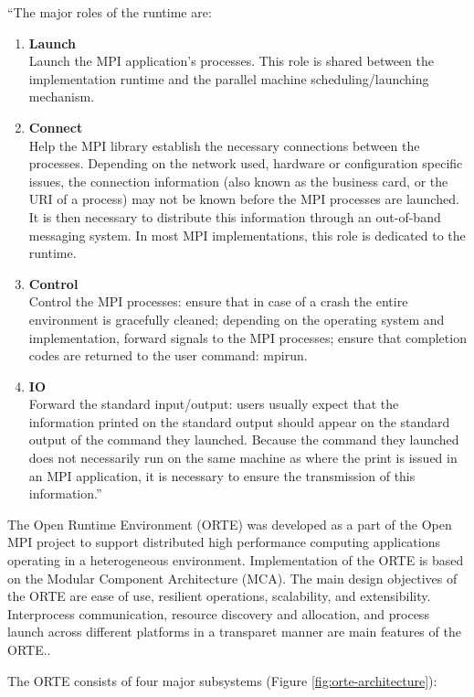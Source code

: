 ``The major roles of the runtime are:
\begin{enumerate}
\item \textbf{Launch}\\
  Launch the MPI application’s processes. This role is shared between the implementation runtime and the parallel machine scheduling/launching mechanism.
\item \textbf{Connect}\\
  Help the MPI library establish the necessary connections between the processes. Depending on the network used, hardware or configuration specific issues, the connection information (also known as the business card, or the URI of
a process) may not be known before the MPI processes are launched. It is then necessary to distribute this information through an out-of-band messaging system. In most MPI implementations, this role is dedicated to the runtime.
\item \textbf{Control}\\
  Control the MPI processes: ensure that in case of a crash the entire environment is gracefully cleaned; depending on the operating system and implementation, forward signals to the MPI processes; ensure that completion codes
are returned to the user command: mpirun.
\item \textbf{IO}\\
  Forward the standard input/output: users usually expect that the information printed on the standard output should appear on the standard output of the command they launched. Because the command they launched does not necessarily run on the same machine as where the print is issued in an MPI application, it is necessary to ensure the transmission of this information.''~\cite{bosilca2011scalability}
\end{enumerate}

The Open Runtime Environment (ORTE) was developed as a part of the Open MPI project to support distributed high performance computing applications operating in a heterogeneous environment. Implementation of the ORTE is based on the Modular Component Architecture (MCA). The main design objectives of the ORTE are ease of use, resilient operations, scalability, and extensibility. Interprocess communication, resource discovery and allocation, and process launch across different platforms in a transparet manner are main features of the ORTE.\cite{castain2005open}.

The ORTE consists of four major subsystems (Figure \ref{fig:orte-architecture})\cite{castain2005open,castain2008open,Castain2008153}:

